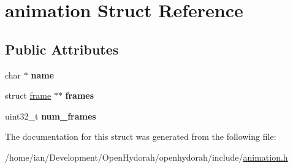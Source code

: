 \hypertarget{structanimation}{\section{animation Struct Reference}
\label{structanimation}
}
\subsection*{Public Attributes}
\begin{DoxyCompactItemize}
\item 
\hypertarget{structanimation_aef37f72a100df4ce61a2c08466f622d4}{char $\ast$ {\bfseries name}}\label{structanimation_aef37f72a100df4ce61a2c08466f622d4}

\item 
\hypertarget{structanimation_a3ba7f87cecb29145f2cdde4c04bea454}{struct \hyperlink{structframe}{frame} $\ast$$\ast$ {\bfseries frames}}\label{structanimation_a3ba7f87cecb29145f2cdde4c04bea454}

\item 
\hypertarget{structanimation_a3f858adf3778e7c02203b7068ab14a0b}{uint32\-\_\-t {\bfseries num\-\_\-frames}}\label{structanimation_a3f858adf3778e7c02203b7068ab14a0b}

\end{DoxyCompactItemize}


The documentation for this struct was generated from the following file\-:\begin{DoxyCompactItemize}
\item 
/home/ian/\-Development/\-Open\-Hydorah/openhydorah/include/\hyperlink{animation_8h}{animation.\-h}\end{DoxyCompactItemize}
